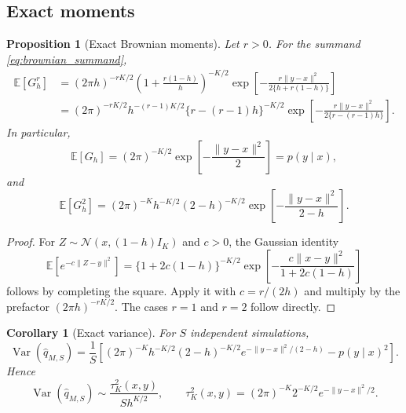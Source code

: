 \documentclass[11pt]{article}
\newtheorem{proposition}{Proposition}
\newtheorem{corollary}{Corollary}
\theoremstyle{definition}
\newcommand{\E}{\mathbb{E}}
\newcommand{\Var}{\operatorname{Var}}
\newcommand{\Normal}{\mathcal{N}}
\begin{document}
\subsection{Exact moments}

\begin{proposition}[Exact Brownian moments]\label{prop:brownian_moments}
Let $r>0$. For the summand \eqref{eq:brownian_summand},
\begin{align}
\E[G_h^r]
&=(2\pi h)^{-rK/2}
\left(1+\frac{r(1-h)}{h}\right)^{-K/2}
\exp\!\left[
-\frac{r\|y-x\|^2}{2\{h+r(1-h)\}}
\right] \label{eq:brownian_r_moment}\\
&=(2\pi)^{-rK/2}
 h^{-(r-1)K/2}
\{r-(r-1)h\}^{-K/2}
\exp\!\left[
-\frac{r\|y-x\|^2}{2\{r-(r-1)h\}}
\right]. \nonumber
\end{align}
In particular,
\begin{equation}\label{eq:brownian_mean}
\E[G_h]=(2\pi)^{-K/2}\exp\!\left[-\frac{\|y-x\|^2}{2}\right]
=p(y\mid x),
\end{equation}
and
\begin{equation}\label{eq:brownian_second}
\E[G_h^2]
=(2\pi)^{-K}h^{-K/2}(2-h)^{-K/2}
\exp\!\left[-\frac{\|y-x\|^2}{2-h}\right].
\end{equation}
\end{proposition}

\begin{proof}
For $Z\sim\Normal(x,(1-h)I_K)$ and $c>0$, the Gaussian identity
\[
\E\!\left[e^{-c\|Z-y\|^2}\right]
=\{1+2c(1-h)\}^{-K/2}
\exp\!\left[-\frac{c\|x-y\|^2}{1+2c(1-h)}\right]
\]
follows by completing the square. Apply it with $c=r/(2h)$ and multiply by the prefactor $(2\pi h)^{-rK/2}$. The cases $r=1$ and $r=2$ follow directly.
\end{proof}

\begin{corollary}[Exact variance]\label{cor:brownian_variance}
For $S$ independent simulations,
\begin{equation}\label{eq:brownian_estimator_variance}
\Var(\widehat q_{M,S})
=
\frac{1}{S}\left[
(2\pi)^{-K}h^{-K/2}(2-h)^{-K/2}
 e^{-\|y-x\|^2/(2-h)}
-p(y\mid x)^2
\right].
\end{equation}
Hence
\begin{equation}\label{eq:brownian_variance_asymptotic}
\Var(\widehat q_{M,S})
\sim
\frac{\tau_K^2(x,y)}{S h^{K/2}},
\qquad
\tau_K^2(x,y)
=(2\pi)^{-K}2^{-K/2}e^{-\|y-x\|^2/2}.
\end{equation}
\end{corollary}
\end{document}

